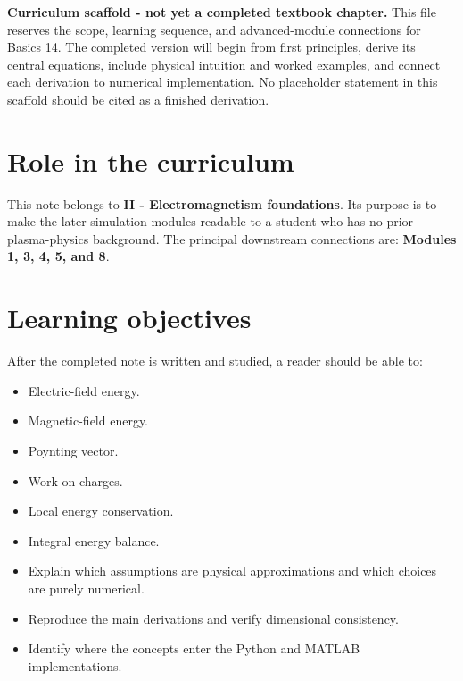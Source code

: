 \documentclass[11pt]{article}
\begin{document}

\begin{overviewbox}
\textbf{Curriculum scaffold - not yet a completed textbook chapter.} This file reserves the scope, learning sequence, and advanced-module connections for Basics 14. The completed version will begin from first principles, derive its central equations, include physical intuition and worked examples, and connect each derivation to numerical implementation. No placeholder statement in this scaffold should be cited as a finished derivation.
\end{overviewbox}

\ProjectTOC

\section{Role in the curriculum}
This note belongs to \textbf{II - Electromagnetism foundations}. Its purpose is to make the later simulation modules readable to a student who has no prior plasma-physics background. The principal downstream connections are: \textbf{Modules 1, 3, 4, 5, and 8}.

\section{Learning objectives}
After the completed note is written and studied, a reader should be able to:
\begin{itemize}[leftmargin=1.6em]
\item Electric-field energy.
\item Magnetic-field energy.
\item Poynting vector.
\item Work on charges.
\item Local energy conservation.
\item Integral energy balance.
\item Explain which assumptions are physical approximations and which choices are purely numerical.
\item Reproduce the main derivations and verify dimensional consistency.
\item Identify where the concepts enter the Python and MATLAB implementations.
\end{itemize}
\end{document}
